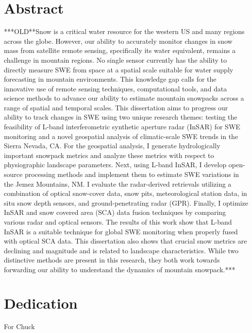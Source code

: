 \documentclass[11pt, oneside, openany]{scrbook}
\begin{document}
\newpage
\setcounter{page}{1} %
\section*{Abstract}
***OLD**Snow is a critical water resource for the western US and many regions across the globe. However, our ability to accurately monitor changes in snow mass from satellite remote sensing, specifically its water equivalent, remains a challenge in mountain regions. No single sensor currently has the ability to directly measure SWE from space at a spatial scale suitable for water supply forecasting in mountain environments. This knowledge gap calls for the innovative use of remote sensing techniques, computational tools, and data science methods to advance our ability to estimate mountain snowpacks across a range of spatial and temporal scales. This dissertation aims to progress our ability to track changes in SWE using two unique research themes: testing the feasibility of L-band interferometric synthetic aperture radar (InSAR) for SWE monitoring and a novel geospatial analysis of climatic-scale SWE trends in the Sierra Nevada, CA. For the geospatial analysis, I generate hydrologically important snowpack metrics and analyze these metrics with respect to physiographic landscape parameters. Next, using L-band InSAR, I develop open-source processing methods and implement them to estimate SWE variations in the Jemez Mountains, NM. I evaluate the radar-derived retrievals utilizing a combination of optical snow-cover data, snow pits, meteorological station data, in situ snow depth sensors, and ground-penetrating radar (GPR). Finally, I optimize InSAR and snow covered area (SCA) data fusion techniques by comparing various radar and optical sensors. The results of this work show that L-band InSAR is a suitable technique for global SWE monitoring when properly fused with optical SCA data. This dissertation also shows that crucial snow metrics are declining and magnitude and is related to landscape characteristics. While two distinctive methods are present in this research, they both work towards forwarding our ability to understand the dynamics of mountain snowpack.***


\newpage
\section*{Dedication}
\begin{center}
  \vfill
  For Chuck
  \vfill
  \null
\end{center}
%
\end{document}
